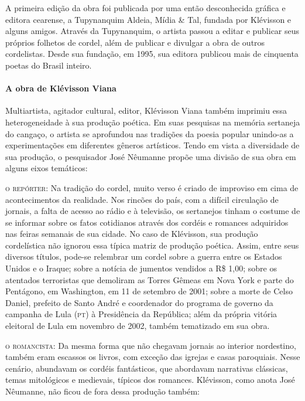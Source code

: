 \documentclass[11pt]{extarticle}
\begin{document}
A primeira edição da obra foi publicada por uma então desconhecida gráfica e editora cearense, a Tupynanquim Aldeia, Mídia \& Tal, fundada por Klévisson e alguns amigos. Através da Tupynanquim, o artista passou a editar e publicar seus próprios folhetos de cordel, além de publicar e divulgar a obra de outros cordelistas. Desde sua fundação, em 1995, sua editora publicou mais de cinquenta poetas do Brasil inteiro.


\paragraph{A obra de Klévisson Viana}
Multiartista, agitador cultural, editor, Klévisson Viana também imprimiu essa heterogeneidade à sua produção poética. Em suas pesquisas na memória sertaneja do cangaço, o artista se aprofundou  nas tradições da poesia popular unindo-as a experimentações em diferentes gêneros artísticos. 
Tendo em vista a diversidade de sua produção, o pesquisador José Nêumanne propõe uma divisão de sua obra em alguns eixos temáticos:

\noindent\textsc{o repórter}: Na tradição do cordel, muito verso é criado de improviso em cima de acontecimentos da realidade. Nos rincões do país, com a difícil circulação de jornais, a falta de acesso ao rádio e à televisão, os sertanejos tinham o costume de se informar sobre os fatos cotidianos através dos cordéis e romances adquiridos nas feiras semanais de sua cidade.
No caso de Klévisson, sua produção cordelística não ignorou essa típica matriz de produção poética. Assim, entre seus diversos títulos, pode-se relembrar um cordel sobre a guerra entre os Estados Unidos e o Iraque; sobre a notícia de jumentos vendidos a R\$ 1,00; sobre 
os atentados terroristas que demoliram as Torres Gêmeas em Nova York e parte do Pentágono, em Washington, em 11 de setembro de 2001; sobre a morte de Celso Daniel, prefeito de Santo André e coordenador do programa de governo da campanha de Lula (\textsc{pt}) à Presidência da República; além da própria vitória eleitoral de Lula em novembro de 2002, também tematizado em sua obra.

\noindent\textsc{o romancista}: Da mesma forma que não chegavam jornais ao interior nordestino, também eram escassos os livros, com exceção das igrejas e casas paroquiais.
Nesse cenário, abundavam os cordéis fantásticos, que abordavam narrativas clássicas, temas mitológicos e medievais, típicos dos romances. 
Klévisson, como anota José Nêumanne, não ficou de fora dessa produção também:
\end{document}

